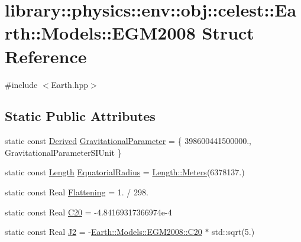 \hypertarget{structlibrary_1_1physics_1_1env_1_1obj_1_1celest_1_1_earth_1_1_models_1_1_e_g_m2008}{}\section{library\+:\+:physics\+:\+:env\+:\+:obj\+:\+:celest\+:\+:Earth\+:\+:Models\+:\+:E\+G\+M2008 Struct Reference}
\label{structlibrary_1_1physics_1_1env_1_1obj_1_1celest_1_1_earth_1_1_models_1_1_e_g_m2008}


{\ttfamily \#include $<$Earth.\+hpp$>$}

\subsection*{Static Public Attributes}
\begin{DoxyCompactItemize}
\item 
static const \hyperlink{classlibrary_1_1physics_1_1units_1_1_derived}{Derived} \hyperlink{structlibrary_1_1physics_1_1env_1_1obj_1_1celest_1_1_earth_1_1_models_1_1_e_g_m2008_a7b4e7619b9a5765d01a4ca697e515490}{Gravitational\+Parameter} = \{ 398600441500000., Gravitational\+Parameter\+S\+I\+Unit \}
\item 
static const \hyperlink{classlibrary_1_1physics_1_1units_1_1_length}{Length} \hyperlink{structlibrary_1_1physics_1_1env_1_1obj_1_1celest_1_1_earth_1_1_models_1_1_e_g_m2008_aa96d890bf95fc1b611ffbb13581284dd}{Equatorial\+Radius} = \hyperlink{classlibrary_1_1physics_1_1units_1_1_length_ad523a3737d5c3f23a64588eac83f2148}{Length\+::\+Meters}(6378137.)
\item 
static const Real \hyperlink{structlibrary_1_1physics_1_1env_1_1obj_1_1celest_1_1_earth_1_1_models_1_1_e_g_m2008_aff355d04ec56fb5b1f589fd2bc855193}{Flattening} = 1. / 298.
\item 
static const Real \hyperlink{structlibrary_1_1physics_1_1env_1_1obj_1_1celest_1_1_earth_1_1_models_1_1_e_g_m2008_a70cf03c48fda3badebf10588c83e183d}{C20} = -\/4.\+84169317366974e-\/4
\item 
static const Real \hyperlink{structlibrary_1_1physics_1_1env_1_1obj_1_1celest_1_1_earth_1_1_models_1_1_e_g_m2008_ac8e230ca34d03fca1377fb593af57e3a}{J2} = -\/\hyperlink{structlibrary_1_1physics_1_1env_1_1obj_1_1celest_1_1_earth_1_1_models_1_1_e_g_m2008_a70cf03c48fda3badebf10588c83e183d}{Earth\+::\+Models\+::\+E\+G\+M2008\+::\+C20} $\ast$ std\+::sqrt(5.)
\end{DoxyCompactItemize}


